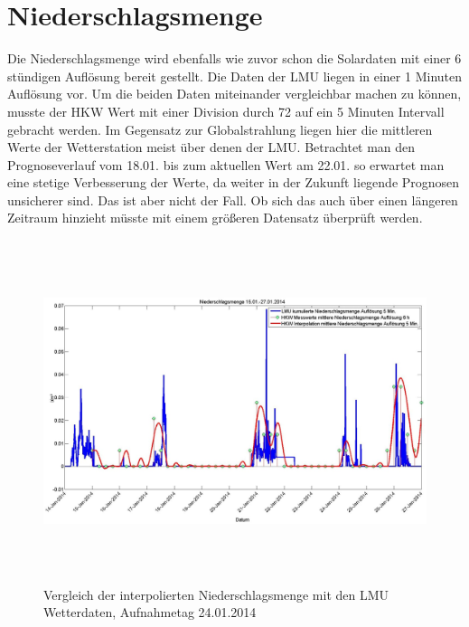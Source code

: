 \section{Niederschlagsmenge}
Die Niederschlagsmenge wird ebenfalls wie zuvor schon die Solardaten mit einer 6 stündigen Auflösung bereit gestellt. Die Daten der LMU liegen in einer 1 Minuten Auflösung vor. Um die beiden Daten miteinander vergleichbar machen zu können, musste der HKW Wert mit einer Division durch 72 auf ein 5 Minuten Intervall gebracht werden. Im Gegensatz zur Globalstrahlung liegen hier die mittleren Werte der Wetterstation meist über denen der LMU. Betrachtet man den Prognoseverlauf vom 18.01. bis zum aktuellen Wert am 22.01. so erwartet man eine stetige Verbesserung der Werte, da weiter in der Zukunft liegende Prognosen unsicherer sind. Das ist aber nicht der Fall. Ob sich das auch über einen längeren Zeitraum hinzieht müsste mit einem größeren Datensatz überprüft werden. 
\begin{figure}[htbp]
\centering
\includegraphics[width=16cm,height=10cm]{analyse/niedersmenge2}
\caption{Vergleich der interpolierten Niederschlagsmenge mit den LMU Wetterdaten, Aufnahmetag 24.01.2014}
\label{fig:niedersmenge}
\end{figure}
